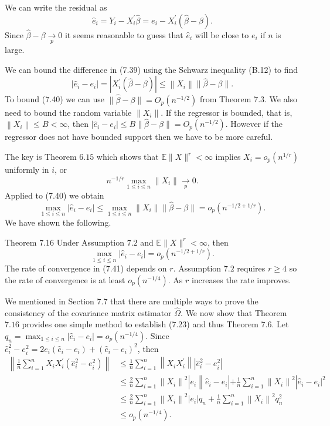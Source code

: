 \documentclass[10pt]{article}
\begin{document}
We can write the residual as
$$
\widehat{e}_{i}=Y_{i}-X_{i}^{\prime} \widehat{\beta}=e_{i}-X_{i}^{\prime}(\widehat{\beta}-\beta) .
$$
Since $\widehat{\beta}-\beta \underset{p}{\longrightarrow} 0$ it seems reasonable to guess that $\widehat{e}_{i}$ will be close to $e_{i}$ if $n$ is large.

We can bound the difference in (7.39) using the Schwarz inequality (B.12) to find
$$
\left|\widehat{e}_{i}-e_{i}\right|=\left|X_{i}^{\prime}(\widehat{\beta}-\beta)\right| \leq\left\|X_{i}\right\|\|\widehat{\beta}-\beta\| .
$$
To bound (7.40) we can use $\|\widehat{\beta}-\beta\|=O_{p}\left(n^{-1 / 2}\right)$ from Theorem 7.3. We also need to bound the random variable $\left\|X_{i}\right\|$. If the regressor is bounded, that is, $\left\|X_{i}\right\| \leq B<\infty$, then $\left|\widehat{e}_{i}-e_{i}\right| \leq B\|\widehat{\beta}-\beta\|=O_{p}\left(n^{-1 / 2}\right)$. However if the regressor does not have bounded support then we have to be more careful.

The key is Theorem $6.15$ which shows that $\mathbb{E}\|X\|^{r}<\infty$ implies $X_{i}=o_{p}\left(n^{1 / r}\right)$ uniformly in $i$, or
$$
n^{-1 / r} \max _{1 \leq i \leq n}\left\|X_{i}\right\| \underset{p}{\longrightarrow} 0 .
$$
Applied to (7.40) we obtain
$$
\max _{1 \leq i \leq n}\left|\widehat{e}_{i}-e_{i}\right| \leq \max _{1 \leq i \leq n}\left\|X_{i}\right\|\|\widehat{\beta}-\beta\|=o_{p}\left(n^{-1 / 2+1 / r}\right) .
$$
We have shown the following.

Theorem 7.16 Under Assumption $7.2$ and $\mathbb{E}\|X\|^{r}<\infty$, then
$$
\max _{1 \leq i \leq n}\left|\widehat{e}_{i}-e_{i}\right|=o_{p}\left(n^{-1 / 2+1 / r}\right) .
$$
The rate of convergence in (7.41) depends on $r$. Assumption $7.2$ requires $r \geq 4$ so the rate of convergence is at least $o_{p}\left(n^{-1 / 4}\right)$. As $r$ increases the rate improves.

We mentioned in Section $7.7$ that there are multiple ways to prove the consistency of the covariance matrix estimator $\widehat{\Omega}$. We now show that Theorem $7.16$ provides one simple method to establish (7.23) and thus Theorem 7.6. Let $q_{n}=\max _{1 \leq i \leq n}\left|\widehat{e}_{i}-e_{i}\right|=o_{p}\left(n^{-1 / 4}\right)$. Since $\widehat{e}_{i}^{2}-e_{i}^{2}=2 e_{i}\left(\widehat{e}_{i}-e_{i}\right)+\left(\widehat{e}_{i}-e_{i}\right)^{2}$, then
$$
\begin{aligned}
\left\|\frac{1}{n} \sum_{i=1}^{n} X_{i} X_{i}^{\prime}\left(\widehat{e}_{i}^{2}-e_{i}^{2}\right)\right\| & \leq \frac{1}{n} \sum_{i=1}^{n}\left\|X_{i} X_{i}^{\prime}\right\|\left|\widehat{e}_{i}^{2}-e_{i}^{2}\right| \\
& \leq \frac{2}{n} \sum_{i=1}^{n}\left\|X_{i}\right\|^{2}\left|e _ { i } \left\|\widehat{e}_{i}-e_{i}\left|+\frac{1}{n} \sum_{i=1}^{n}\left\|X_{i}\right\|^{2}\right| \widehat{e}_{i}-\left.e_{i}\right|^{2}\right.\right.\\
& \leq \frac{2}{n} \sum_{i=1}^{n}\left\|X_{i}\right\|^{2}\left|e_{i}\right| q_{n}+\frac{1}{n} \sum_{i=1}^{n}\left\|X_{i}\right\|^{2} q_{n}^{2} \\
& \leq o_{p}\left(n^{-1 / 4}\right) .
\end{aligned}
$$
\end{document}
